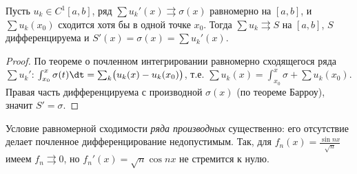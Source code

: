\begin{theorem}
Пусть $u_k\in C^1[a,b]$, ряд $\sum u_k'(x)\rightrightarrows\sigma(x)$ равномерно на $[a,b]$, и
$\sum u_k(x_0)$ сходится хотя бы в одной точке $x_0$. Тогда $\sum u_k\rightrightarrows S$ на
$[a,b]$, $S$ дифференцируема и $S'(x)=\sigma(x)=\sum u_k'(x)$.
\end{theorem}

\begin{proof}
По теореме о почленном интегрировании равномерно сходящегося ряда $\sum u_k'$:
$\int_{x_0}^x\sigma(t)\dt=\sum_k\bigl(u_k(x)-u_k(x_0)\bigr)$, т.е.
$\sum u_k(x)=\int_{x_0}^x\sigma+\sum u_k(x_0)$. Правая часть дифференцируема с производной
$\sigma(x)$ (по теореме Барроу), значит $S'=\sigma$.
\end{proof}

\begin{remark}
Условие равномерной сходимости \emph{ряда производных} существенно: его отсутствие делает
почленное дифференцирование недопустимым. Так, для $f_n(x)=\tfrac{\sin nx}{\sqrt n}$ имеем
$f_n\rightrightarrows0$, но $f_n'(x)=\sqrt n\cos nx$ не стремится к нулю.
\end{remark}
